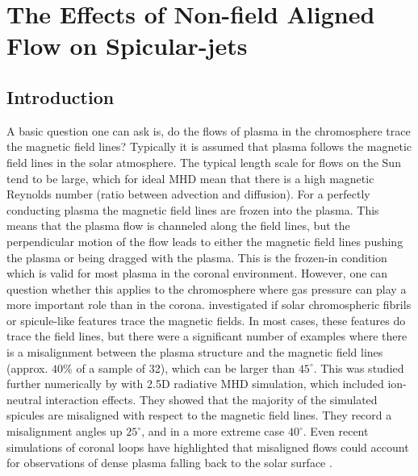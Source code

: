 \documentclass[12pt]{ociamthesis}
\newcommand{\np}{\\ \\}
\newcommand{\degs}{^{\circ}}
\begin{document}
\baselineskip=18pt

\setcounter{secnumdepth}{3}
\setcounter{tocdepth}{3}

\setcounter{chapter}{2}

\chapter{The Effects of Non-field Aligned Flow on Spicular-jets}
\section{Introduction}
\label{sec:c3intro}
A basic question one can ask is, do the flows of plasma in the chromosphere trace the magnetic field lines? Typically it is assumed that plasma follows the magnetic field lines in the solar atmosphere. The typical length scale for flows on the Sun tend to be large, which for ideal MHD mean that there is a high magnetic Reynolds number (ratio between advection and diffusion). For a perfectly conducting plasma the magnetic field lines are frozen into the plasma. This means that the plasma flow is channeled along the field lines, but the perpendicular motion of the flow leads to either the magnetic field lines pushing the plasma or being dragged with the plasma. This is the frozen-in condition which is valid for most plasma in the coronal environment. However, one can question whether this applies to the chromosphere where gas pressure can play a more important role than in the corona. \cite{delaCruzRodr2011AA527L8D} investigated if solar chromospheric fibrils or spicule-like features trace the magnetic fields. In most cases, these features do trace the field lines, but there were a significant number of examples where there is a misalignment between the plasma structure and the magnetic field lines (approx. $40\%$ of a sample of 32), which can be larger than $45\degs$. This was studied further numerically by \cite{Mart2016ApJ831L1M} with 2.5D radiative MHD simulation, which included ion-neutral interaction effects. They showed that the majority of the simulated spicules are misaligned with respect to the magnetic field lines. They record a misalignment angles up $25\degs$, and in a more extreme case $40\degs$. Even recent simulations of coronal loops have highlighted that misaligned flows could account for observations of dense plasma falling back to the solar surface \citep{Petralia2018AA609A18P}. \np
\end{document}
